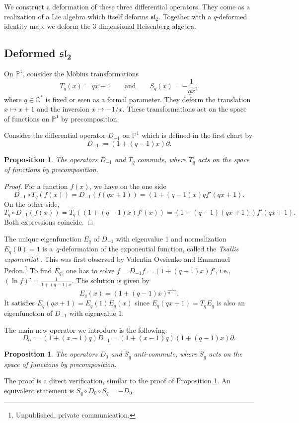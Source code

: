 \documentclass[10pt,a4paper]{amsart}
\numberwithin{equation}{section}
\newtheorem{Proposition}[Theorem]{Proposition}
 { \theoremstyle{definition}
\newtheorem{Definition}[Theorem]{Definition}
\newtheorem{Note}[Theorem]{Note}
\newtheorem{Example}[Theorem]{Example}
\newtheorem{Remark}[Theorem]{Remark} }
\newcommand*{\C}{\mathbb{C}}
\begin{document}
We construct a deformation of these three differential operators. They come as a realization of a Lie algebra which itself deforms $\mathfrak{sl}_2$. Together with a $q$-deformed identity map, we deform the 3-dimensional Heisenberg algebra.


\subsection[Deformed sl\_2]{Deformed $\boldsymbol{\mathfrak{sl}_2}$}
On $\mathbb{P}^1$, consider the M\"obius transformations
\[
T_q(x)=qx+1 \qquad \text{and}\qquad S_q(x)=-\frac{1}{qx},
\]
where $q\in \C^*$ is fixed or seen as a formal parameter.
They deform the translation $x\mapsto x+1$ and the inversion $x\mapsto -1/x$. These transformations act on the space of functions on $\mathbb{P}^1$ by precomposition.

Consider the differential operator $D_{-1}$ on $\mathbb{P}^1$ which is defined in the first chart by
\[%
D_{-1}:=(1+(q-1)x)\partial.
\]

\begin{Proposition}\label{Prop:commute-T_q}
The operators $D_{-1}$ and $T_q$ commute, where $T_q$ acts on the space of functions by precomposition.
\end{Proposition}
\begin{proof}
For a function $f(x)$, we have on the one side
\[
D_{-1}\circ T_q(f(x))=D_{-1}(f(qx+1)) = (1+(q-1)x)qf'(qx+1).
\]
On the other side,
\[
T_q\circ D_{-1}(f(x))=T_q((1+(q-1)x)f'(x)) = (1+(q-1)(qx+1))f'(qx+1).
\]
Both expressions coincide.
\end{proof}

The unique eigenfunction $E_q$ of $D_{-1}$ with eigenvalue 1 and normalization $E_q(0)=1$ is a~$q$-deformation of the exponential function, called the \emph{Tsallis exponential} \cite{tsallis1988possible}. This was first observed by Valentin Ovsienko and Emmanuel Pedon.\footnote{Unpublished, private communication.} To find $E_q$, one has to solve ${f=D_{-1}f=(1+(q-1)x)f'}$, i.e., $(\ln f)'=\frac{1}{1+(q-1)x}$. The solution is given by
\[
E_q(x)=(1+(q-1)x)^{\frac{1}{q-1}}.
\]
It satisfies $E_q(qx+1)=E_q(1)E_q(x)$ since $E_q(qx+1)=T_qE_q$ is also an eigenfunction of $D_{-1}$ with eigenvalue 1.


The main new operator we introduce is the following:
\[%
D_0:=(1+(x-1)q)D_{-1}=(1+(x-1)q)(1+(q-1)x)\partial.
\]

\begin{Proposition}\label{Prop:commute-S_q}
The operators $D_0$ and $S_q$ anti-commute, where $S_q$ acts on the space of functions by precomposition.
\end{Proposition}
The proof is a direct verification, similar to the proof of Proposition \ref{Prop:commute-T_q}. An equivalent statement is $S_q\circ D_0\circ S_q=-D_0$.
\end{document}
